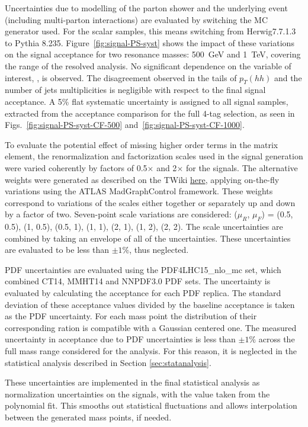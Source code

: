 Uncertainties due to modelling of the parton shower and the underlying event
(including multi-parton interactions) are evaluated by switching the MC generator
used. For the scalar samples, this means switching from Herwig7.7.1.3
to Pythia 8.235. Figure~\ref{fig:signal-PS-syst} shows the impact of these variations on the signal acceptance 
for two resonance masses: \SI{500}{\GeV} and \SI{1}{\TeV}, covering the range of the resolved analysis. 
No significant dependence on the variable of interest, \mhh, is observed. The disagreement observed in the tails 
of $p_T (hh)$ and the number of jets multiplicities is negligible with respect to the final signal acceptance. 
A 5\% flat systematic uncertainty is assigned to all signal samples, extracted from the acceptance comparison
for the full 4-tag selection, as seen in Figs.~\ref{fig:signal-PS-syst-CF-500} and~\ref{fig:signal-PS-syst-CF-1000}. 


To evaluate the potential effect of missing higher order terms in the matrix
element, the renormalization and factorization scales used in the signal
generation were varied coherently by factors of 0.5$\times$ and 2$\times$ for
the signals. The alternative weights were generated as described on the TWiki
\href{https://twiki.cern.ch/twiki/bin/viewauth/AtlasProtected/SignalTheoryUncertainties?rev=2}{here},
applying on-the-fly variations using the ATLAS MadGraphControl framework. These
weights correspond to variations of the scales either together or separately up
and down by a factor of two. Seven-point scale variations are considered:
($\mu_R$, $\mu_F$) = (0.5, 0.5), (1, 0.5), (0.5, 1), (1, 1), (2, 1), (1, 2), (2,
2). The scale uncertainties are combined by taking an envelope of all of the
uncertainties. These uncertainties are evaluated to be less than $\pm1\%$, thus
neglected.

PDF uncertainties are evaluated using the PDF4LHC15_nlo_mc set, which combined CT14,
MMHT14 and NNPDF3.0 PDF sets. The uncertainty is evaluated by
calculating the acceptance for each PDF replica. The standard deviation of these
acceptance values divided by the baseline acceptance is taken as the PDF uncertainty.
For each mass point the distribution of their corresponding ration is compatible
with a Gaussian centered one. The measured 
uncertainty in acceptance due to PDF uncertainties is less than $\pm1\%$ across the
full mass range considered for the analysis. For this reason, it is
neglected in the statistical analysis described in Section \ref{sec:statanalysis}.

These uncertainties are implemented in the final statistical analysis as normalization
uncertainties on the signals, with the value taken from the polynomial fit. This smooths
out statistical fluctuations and allows interpolation between the generated mass points, if needed.

